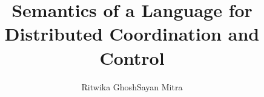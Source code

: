 \setlength{\pdfpageheight}{\paperheight}
\setlength{\pdfpagewidth}{\paperwidth}



\title{Semantics of a Language for Distributed Coordination and Control}
\author{Ritwika Ghosh\qquad Sayan Mitra}


\maketitle